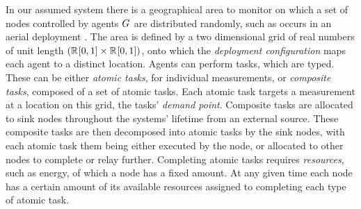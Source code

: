 In our assumed system there is a geographical area to monitor on which a set of nodes controlled by agents $G_{}^{}$ are distributed randomly, such as occurs in an aerial deployment \citep{Kumar2013}.  The area is defined by a two dimensional grid of real numbers of unit length  $(\mathbb{R}_{}^{}[0,1] \times \mathbb{R}_{}^{}[0,1])$, onto which the \textit{deployment configuration} maps each agent to a distinct location.  Agents can perform tasks, which are typed. These can be either \textit{atomic tasks}, for individual measurements, or \textit{composite tasks}, composed of a set of atomic tasks. Each atomic task targets a measurement at a location on this grid, the tasks' \textit{demand point}. Composite tasks are allocated to sink nodes throughout the systems' lifetime from an external source. These composite tasks are then decomposed into atomic tasks by the sink nodes, with each atomic task them being either executed by the node, or allocated to other nodes to complete or relay further. Completing atomic tasks requires \textit{resources}, such as energy, of which a node has a fixed amount. At any given time each node has a certain amount of its  available resources assigned to completing each type of atomic task. 
